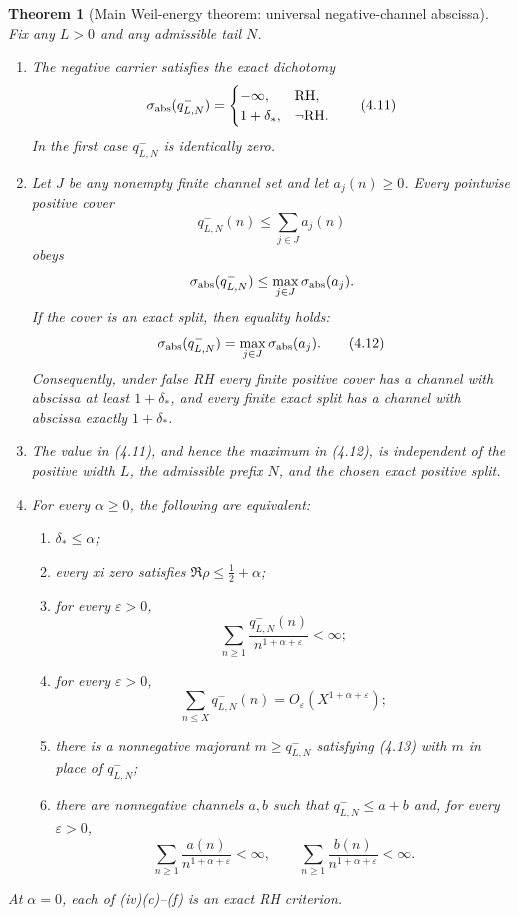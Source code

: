 \documentclass[11pt]{article}
\newtheorem{theorem}{Theorem}[section]
\begin{document}
\begin{theorem}[Main Weil-energy theorem: universal negative-channel abscissa]
\label{thm:universal-abscissa}
Fix any $L>0$ and any admissible tail $N$.

\begin{enumerate}[label=\textup{(\roman*)}]
\item The negative carrier satisfies the exact dichotomy
\[
 \sigma_{\rm abs}(q_{L,N}^-)=
 \begin{cases}
  -\infty,&\mathrm{RH},\\
  1+\delta_*,&\neg\mathrm{RH}.
 \end{cases}
 \tag{4.11}
\]
In the first case $q_{L,N}^-$ is identically zero.

\item Let $J$ be any nonempty finite channel set and let $a_j(n)\ge0$.
Every pointwise positive cover
\[
 q_{L,N}^-(n)\le\sum_{j\in J}a_j(n)
\]
obeys
\[
 \sigma_{\rm abs}(q_{L,N}^-)
 \le\max_{j\in J}\sigma_{\rm abs}(a_j).
\]
If the cover is an exact split, then equality holds:
\[
 \sigma_{\rm abs}(q_{L,N}^-)
 =\max_{j\in J}\sigma_{\rm abs}(a_j).
 \tag{4.12}
\]
Consequently, under false RH every finite positive cover has a channel with abscissa at least
$1+\delta_*$, and every finite exact split has a channel with abscissa exactly $1+\delta_*$.

\item The value in \textup{(4.11)}, and hence the maximum in \textup{(4.12)}, is independent
of the positive width $L$, the admissible prefix $N$, and the chosen exact positive split.

\item For every $\alpha\ge0$, the following are equivalent:
\begin{enumerate}[label=\textup{(\alph*)}]
\item $\delta_*\le\alpha$;
\item every xi zero satisfies $\Re\rho\le\frac12+\alpha$;
\item for every $\varepsilon>0$,
\[
 \sum_{n\ge1}\frac{q_{L,N}^-(n)}{n^{1+\alpha+\varepsilon}}<\infty;
 \tag{4.13}
\]
\item for every $\varepsilon>0$,
\[
 \sum_{n\le X}q_{L,N}^-(n)
 =O_\varepsilon(X^{1+\alpha+\varepsilon});
 \tag{4.13a}
\]
\item there is a nonnegative majorant $m\ge q_{L,N}^-$ satisfying \textup{(4.13)} with
$m$ in place of $q_{L,N}^-$;
\item there are nonnegative channels $a,b$ such that
$q_{L,N}^-\le a+b$ and, for every $\varepsilon>0$,
\[
 \sum_{n\ge1}\frac{a(n)}{n^{1+\alpha+\varepsilon}}<\infty,
 \qquad
 \sum_{n\ge1}\frac{b(n)}{n^{1+\alpha+\varepsilon}}<\infty.
 \tag{4.14}
\]
\end{enumerate}
\end{enumerate}
At $\alpha=0$, each of \textup{(iv)(c)--(f)} is an exact RH criterion.
\end{theorem}
\end{document}
